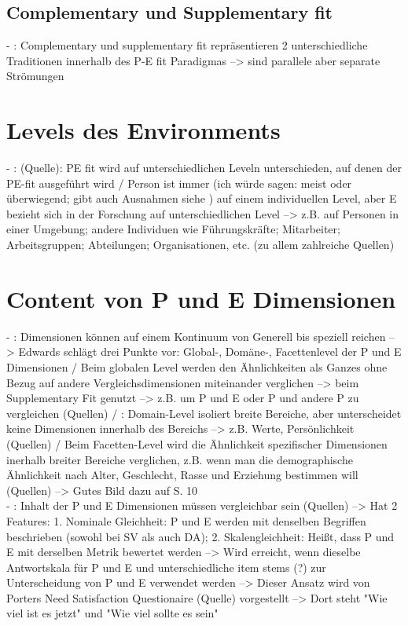 \subsection{Complementary und Supplementary fit}
\label{ch:notizen:formen:complementaryUndSupplementary}
- \cite[S. 1]{edwards:2004}: Complementary und supplementary fit repräsentieren 2 unterschiedliche Traditionen innerhalb des P-E fit Paradigmas --> sind parallele aber separate Strömungen

\section{Levels des Environments}
\label{ch:notizen:levelsDesEnvironments}
- \cite[S. 5f.]{edwards:2007}: (Quelle): PE fit wird auf unterschiedlichen Leveln unterschieden, auf denen der PE-fit ausgeführt wird / Person ist immer (ich würde sagen: meist oder überwiegend; gibt auch Ausnahmen siehe \cite[S. 6]{edwards:2007}) auf einem individuellen Level, aber E bezieht sich in der Forschung auf unterschiedlichen Level --> z.B. auf Personen in einer Umgebung; andere Individuen wie Führungskräfte; Mitarbeiter; Arbeitsgruppen; Abteilungen; Organisationen, etc. (zu allem zahlreiche Quellen)

\section{Content von P und E Dimensionen}
\label{ch:notizen:contentVonPundEDimensionen}
- \cite[S. 6]{edwards:2007}: Dimensionen können auf einem Kontinuum von Generell bis speziell reichen --> Edwards schlägt drei Punkte vor: Global-, Domäne-, Facettenlevel der P und E Dimensionen / Beim globalen Level werden den Ähnlichkeiten als Ganzes ohne Bezug auf andere Vergleichsdimensionen miteinander verglichen --> beim Supplementary Fit genutzt --> z.B. um P und E oder P und andere P zu vergleichen (Quellen) / \cite[S. 7]{edwards:2007}: Domain-Level  isoliert breite Bereiche, aber unterscheidet keine Dimensionen innerhalb des Bereichs --> z.B. Werte, Persönlichkeit (Quellen) / Beim Facetten-Level wird die Ähnlichkeit spezifischer Dimensionen inerhalb breiter Bereiche verglichen, z.B. wenn man die demographische Ähnlichkeit nach Alter, Geschlecht, Rasse und Erziehung bestimmen will (Quellen) --> Gutes Bild dazu auf S. 10 \\
- \cite[S. 7]{edwards:2007}: Inhalt der P und E Dimensionen müssen vergleichbar sein (Quellen) --> Hat 2 Features: 1. Nominale Gleichheit: P und E werden mit denselben Begriffen beschrieben (sowohl bei SV als auch DA); 2. Skalengleichheit: Heißt, dass P und E mit derselben Metrik bewertet werden \cite{copingAndAdaption:1974} --> Wird erreicht, wenn dieselbe Antwortskala für P und E und unterschiedliche item stems (?) zur Unterscheidung von P und E verwendet werden --> Dieser Ansatz wird von Porters Need Satisfaction Questionaire (Quelle) vorgestellt --> Dort steht "Wie viel ist es jetzt" und "Wie viel sollte es sein"

